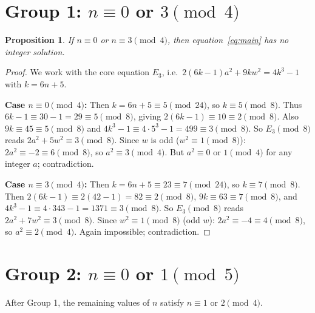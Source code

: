 \documentclass[12pt]{article}
\newtheorem{proposition}[theorem]{Proposition}
\begin{document}
\section{Group 1: \texorpdfstring{$n \equiv 0$ or $3 \pmod 4$}{n = 0 or 3 (mod 4)}}\label{sec:group1}

\begin{proposition}\label{prop:group1}
If $n \equiv 0$ or $n \equiv 3 \pmod{4}$, then equation~\eqref{eq:main} has no integer solution.
\end{proposition}
\begin{proof}
We work with the core equation $E_3$, i.e.\ $2(6k-1)a^2 + 9kw^2 = 4k^3-1$ with $k = 6n+5$.

\smallskip\noindent\textbf{Case $n \equiv 0 \pmod{4}$:}
Then $k = 6n+5 \equiv 5 \pmod{24}$, so $k \equiv 5 \pmod 8$.
Thus $6k - 1 \equiv 30-1 = 29 \equiv 5 \pmod 8$, giving $2(6k-1) \equiv 10 \equiv 2 \pmod 8$.
Also $9k \equiv 45 \equiv 5 \pmod 8$ and $4k^3-1 \equiv 4\cdot 5^3 - 1 = 499 \equiv 3 \pmod 8$.
So $E_3 \pmod 8$ reads $2a^2 + 5w^2 \equiv 3 \pmod 8$.
Since $w$ is odd ($w^2 \equiv 1 \pmod 8$): $2a^2 \equiv -2 \equiv 6 \pmod 8$, so $a^2 \equiv 3 \pmod 4$.
But $a^2 \equiv 0$ or $1 \pmod 4$ for any integer $a$; contradiction.

\smallskip\noindent\textbf{Case $n \equiv 3 \pmod{4}$:}
Then $k = 6n+5 \equiv 23 \equiv 7 \pmod{24}$, so $k \equiv 7 \pmod 8$.
Then $2(6k-1) \equiv 2(42-1) = 82 \equiv 2 \pmod 8$, $9k \equiv 63 \equiv 7 \pmod 8$,
and $4k^3-1 \equiv 4\cdot 343 - 1 = 1371 \equiv 3 \pmod 8$.
So $E_3 \pmod 8$ reads $2a^2 + 7w^2 \equiv 3 \pmod 8$.
Since $w^2 \equiv 1 \pmod 8$ (odd $w$): $2a^2 \equiv -4 \equiv 4 \pmod 8$, so $a^2 \equiv 2 \pmod 4$.
Again impossible; contradiction.
\end{proof}

\section{Group 2: \texorpdfstring{$n \equiv 0$ or $1 \pmod 5$}{n = 0 or 1 (mod 5)}}\label{sec:group2}

After Group 1, the remaining values of $n$ satisfy $n \equiv 1$ or $2 \pmod 4$.
\end{document}
